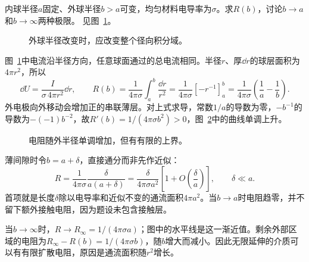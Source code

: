 \begin{exercise}[同心电极之间的介质厚度]\label{ex:c1-h3}
内球半径$a$固定、外球半径$b>a$可变，均匀材料电导率为$\sigma$。求$R(b)$，讨论$b\to a$和$b\to\infty$两种极限。 见图~\ref{fig:c1-h3-q}。
\end{exercise}

\begin{figure}[H]\centering
{}
\caption{外球半径改变时，应改变整个径向积分域。}\label{fig:c1-h3-q}
\end{figure}
\begin{solution}
图~\ref{fig:c1-h3-q}中电流沿半径方向，任意球面通过的总电流相同。半径$r$、厚$\dd r$的球层面积为$4\pi r^2$，所以
\[
 \dd U=\frac I{\sigma\,4\pi r^2}\dd r,
 \qquad \boxed{R(b)=\frac1{4\pi\sigma}\int_a^b\frac{\dd r}{r^2}
 =\frac1{4\pi\sigma}[-r^{-1}]_a^b
 =\frac1{4\pi\sigma}\left(\frac1a-\frac1b\right)}.
\]
外电极向外移动会增加正的串联薄层。对上式求导，常数$1/a$的导数为零，$-b^{-1}$的导数为$-(-1)b^{-2}$，故$R'(b)=1/(4\pi\sigma b^2)>0$，图~\ref{fig:c1-h3-s}中的曲线单调上升。
\begin{figure}[H]\centering
{}
\caption{电阻随外半径单调增加，但有有限的上界。}\label{fig:c1-h3-s}
\end{figure}
薄间隙时令$b=a+\delta$，直接通分而非先作近似：
\[
 R=\frac1{4\pi\sigma}\frac\delta{a(a+\delta)}
 =\frac\delta{4\pi\sigma a^2}
 \left[1+O\!\left(\frac\delta a\right)\right],\qquad\delta\ll a.
\]
首项就是长度$\delta$除以电导率和近似不变的通流面积$4\pi a^2$。当$b\to a$时电阻趋零，并不留下额外接触电阻，因为题设未包含接触层。

当$b\to\infty$时，$R\to R_\infty=1/(4\pi\sigma a)$；图中的水平线是这一渐近值。剩余外部区域的电阻为$R_\infty-R(b)=1/(4\pi\sigma b)$，随$b$增大而减小。因此无限延伸的介质可以有有限扩散电阻，原因是通流面积随$r^2$增长。
\end{solution}


